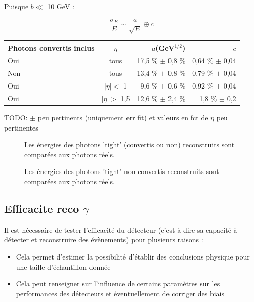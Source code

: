 \documentclass[11pt]{article} %
\begin{document}
Puisque $b \ll $ 10 GeV :

\begin{equation}
\dfrac{\sigma_E}{E} \sim \dfrac{a}{\sqrt{E}} \oplus c
\end{equation}

\begin{tabular}{|l|c|r|r|} 
   \hline
   Photons convertis inclus &$\eta$ & $a$(GeV${ }^{1/2}$) & $c$ \\
    \hline
   Oui & tous & 17,5 \% $\pm$ 0,8 \% &0,64 \% $\pm$ 0,04  \\
  \hline
   Non & tous & 13,4 \% $\pm$ 0,8 \% &0,79 \% $\pm$ 0,04  \\
  \hline
   Oui &$|\eta| < $ 1 & 9,6 \% $\pm$ 0,6 \% &0,92 \% $\pm$ 0,04  \\
\hline
   Oui & $|\eta| >$ 1,5 & 12,6 \% $\pm$ 2,4 \% &1,8 \% $\pm$ 0,2  \\
\hline
\end{tabular}

TODO: $\pm$ peu pertinents (uniquement err fit) et valeurs en fct de $\eta$ peu pertinentes



\begin{figure}[H]
\centering
  \caption{Les énergies des photons 'tight' (convertis ou non) reconstruits sont comparées aux photons réels. }
 \resizebox{.9\linewidth}{!}{}
\end{figure}

\begin{figure}[H]
\centering
  \caption{Les énergies des photons 'tight' non convertis reconstruits sont comparées aux photons réels. }
 \resizebox{.9\linewidth}{!}{}
\end{figure}

\subsection{Efficacite reco $\gamma$}

Il est nécessaire de tester l'efficacité du détecteur (c'est-à-dire sa capacité à détecter et reconstruire des évènements) pour plusieurs raisons :

\begin{itemize}
\item{Cela permet d'estimer la possibilité d'établir des conclusions physique pour une taille d'échantillon donnée}
\item{Cela peut renseigner sur l'influence de certains paramètres sur les performances des détecteurs et éventuellement de corriger des biais}
\end{itemize}
\end{document}
